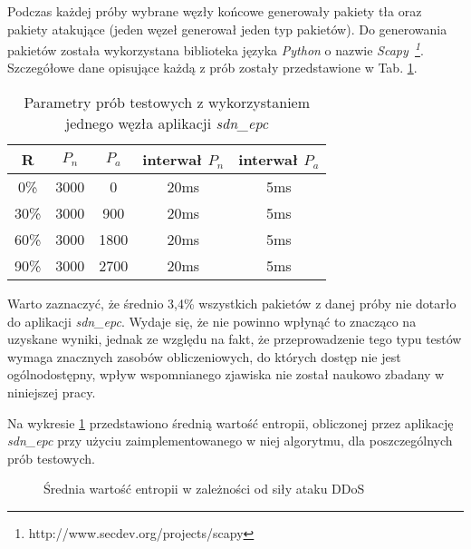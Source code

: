 Podczas każdej próby wybrane węzły końcowe generowały pakiety tła oraz
pakiety atakujące (jeden węzeł generował jeden typ pakietów). Do generowania
pakietów została wykorzystana biblioteka języka \textit{Python} o nazwie
\mbox{\textit{Scapy \footnote{http://www.secdev.org/projects/scapy}}}. Szczegółowe
dane opisujące każdą z prób zostały przedstawione w Tab. \ref{tab:entropy}.

\begin{table}[h!]
\centering
\begin{tabular}{ |c|c|c|c|c| } 
 \hline
 R & $P_{n}$ & $P_{a}$ & interwał $P_{n}$ & interwał $P_{a}$ \\
 \hline
 0\% & 3000 & 0 & 20ms & 5ms \\ 
 \hline
 30\% & 3000 & 900 & 20ms & 5ms \\ 
 \hline
 60\% & 3000 & 1800 & 20ms & 5ms \\ 
 \hline
 90\% & 3000 & 2700 & 20ms & 5ms \\ 
 \hline
\end{tabular}
\caption{Parametry prób testowych z wykorzystaniem jednego węzła aplikacji
  \textit{sdn\_epc}} 
\label{tab:entropy}
\end{table}

Warto zaznaczyć, że średnio 3,4\% wszystkich pakietów z danej próby nie dotarło
do aplikacji \textit{sdn\_epc}. Wydaje się, że nie powinno wpłynąć to znacząco
na uzyskane wyniki, jednak ze względu na fakt, że przeprowadzenie tego typu
testów wymaga znacznych zasobów obliczeniowych, do których dostęp nie jest
ogólnodostępny, wpływ wspomnianego zjawiska nie został naukowo zbadany w
niniejszej pracy.

Na wykresie \ref{plot:entropy} przedstawiono średnią wartość entropii,
obliczonej przez aplikację \textit{sdn\_epc} przy użyciu zaimplementowanego w
niej algorytmu, dla poszczególnych prób testowych.

\begin{figure}[h]
\centering
{}
\caption{Średnia wartość entropii w zależności od siły ataku DDoS}
\label{plot:entropy}
\end{figure}
\newpage

